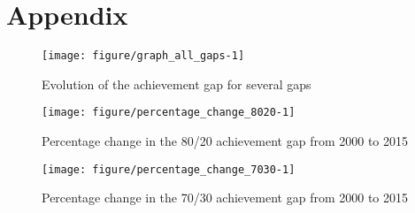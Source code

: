 \documentclass[11pt, a4paper]{article}\usepackage[]{graphicx}\usepackage[]{color}
\begin{document}
\section{Appendix}

\begin{figure}
\begin{center}


{\centering \texttt{[image: figure/graph\_all\_gaps-1]} 

}



\caption{Evolution of the achievement gap for several gaps}
\end{center}
\end{figure}

\begin{figure}
\begin{center}


{\centering \texttt{[image: figure/percentage\_change\_8020-1]} 

}



\caption{Percentage change in the 80/20 achievement gap from 2000 to 2015}
\end{center}
\end{figure}

\begin{figure}
\begin{center}


{\centering \texttt{[image: figure/percentage\_change\_7030-1]} 

}



\caption{Percentage change in the 70/30 achievement gap from 2000 to 2015}
\end{center}
\end{figure}
\end{document}
